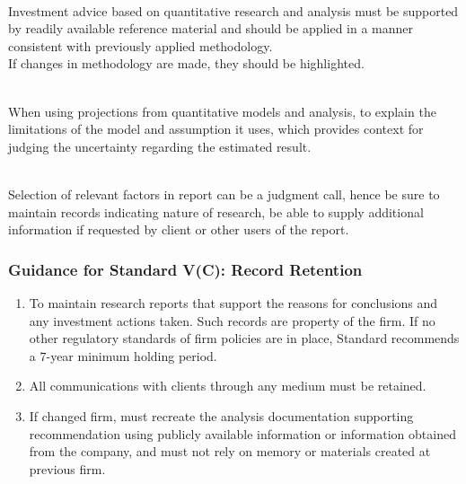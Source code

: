 \begin{remark} \\
Investment advice based on quantitative research and analysis must be supported by readily available reference material and should be applied in a manner consistent with previously applied methodology.\\
If changes in methodology are made, they should be highlighted.
\end{remark}

\begin{remark} \\
When using projections from quantitative models and analysis, to explain the limitations of the model and assumption it uses, which provides context for judging the uncertainty regarding the estimated result.
\end{remark}

\begin{remark} \\
Selection of relevant factors in report can be a judgment call, hence be sure to maintain records indicating nature of research, be able to supply additional information if requested by client or other users of the report.
\end{remark}

\subsubsection{Guidance for Standard V(C): Record Retention}

\begin{remark} 
\begin{enumerate}[label=\roman*.]
\setlength{\itemsep}{0pt}
\item To maintain research reports that support the reasons for conclusions and any investment actions taken. Such records are property of the firm. If no other regulatory standards of firm policies are in place, Standard recommends a $7$-year minimum holding period.
\item All communications with clients through any medium must be retained.
\item If changed firm, must recreate the analysis documentation supporting recommendation using publicly available information or information obtained from the company, and must not rely on memory or materials created at previous firm.
\end{enumerate}
\end{remark}

